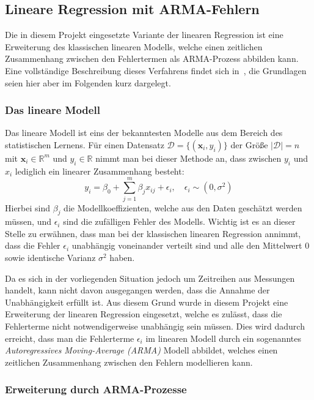 \subsection{Lineare Regression mit ARMA-Fehlern}
\label{sec:arma}

Die in diesem Projekt eingesetzte Variante der linearen Regression ist eine Erweiterung des klassischen linearen Modells,
welche einen zeitlichen Zusammenhang zwischen den Fehlertermen als ARMA-Prozess abbilden kann.
Eine vollst\"andige Beschreibung dieses Verfahrens findet sich in~\cite{forecasting},
die Grundlagen seien hier aber im Folgenden kurz dargelegt.

\subsubsection{Das lineare Modell}

Das lineare Modell ist eins der bekanntesten Modelle aus dem Bereich des statistischen Lernens.
F\"ur einen Datensatz $\mathcal{D} = \{(\mathbf{x}_i, y_i)\}$ der Gr\"o{\ss}e $\left| \mathcal{D} \right| = n$
mit $\mathbf{x}_i \in \mathbb{R}^m$ und $y_i \in \mathbb{R}$
nimmt man bei dieser Methode an, dass zwischen $y_i$ und $x_i$ lediglich ein linearer Zusammenhang besteht:
\begin{equation}
    y_i = \beta_0 + \sum_{j=1}^m \beta_j x_{ij} + \epsilon_i, \quad \epsilon_i \sim (0, \sigma^2)
\end{equation}
Hierbei sind $\beta_j$ die Modellkoeffizienten, welche aus den Daten gesch\"atzt werden m\"ussen, und $\epsilon_i$ sind die
zuf\"alligen Fehler des Modells.
Wichtig ist es an dieser Stelle zu erw\"ahnen, dass man bei der klassischen linearen Regression annimmt, dass die Fehler $\epsilon_i$
unabh\"angig voneinander verteilt sind und alle den Mittelwert 0 sowie identische Varianz $\sigma^2$ haben.

Da es sich in der vorliegenden Situation jedoch um Zeitreihen aus Messungen handelt,
kann nicht davon ausgegangen werden, dass die Annahme der Unabh\"angigkeit erf\"ullt ist.
Aus diesem Grund wurde in diesem Projekt eine Erweiterung der linearen Regression eingesetzt, welche es zul\"asst, dass die
Fehlerterme nicht notwendigerweise unabh\"angig sein m\"ussen.
Dies wird dadurch erreicht, dass man die Fehlerterme $\epsilon_i$ im linearen Modell durch ein sogenanntes
\textit{Autoregressives Moving-Average (ARMA)} Modell abbildet, welches einen zeitlichen Zusammenhang zwischen
den Fehlern modellieren kann.

\subsubsection{Erweiterung durch ARMA-Prozesse}

